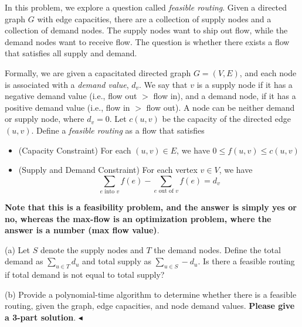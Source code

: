 \documentclass[11pt]{article}
\newenvironment{problem}[2][Problem]{\begin{trivlist}
    \item[\hskip \labelsep{\bfseries#1}\hskip\labelsep{\bfseries#2.}]\mbox{}\newline}{\hfill$\blacktriangleleft$\end{trivlist}}
\begin{document}
\begin{problem}{4. (Feasible Routing)}
    In this problem, we explore a question called \textit{feasible routing}. Given a directed graph $G$ with edge capacities, there are a collection of supply nodes and a collection of demand nodes. The supply nodes want to ship out flow, while the demand nodes want to receive flow. The question is whether there exists a flow that satisfies all supply and demand.

Formally, we are given a capacitated directed graph $G=(V,E)$, and each node is associated with a \textit{demand value}, $d_v$. We say that $v$ is a supply node if it has a negative demand value (i.e., flow out $>$ flow in), and a demand node, if it has a positive demand value (i.e., flow in $>$ flow out). A node can be neither demand or supply node, where $d_v = 0$. Let $c(u,v)$ be the capacity of the directed edge $(u,v)$. Define a \textit{feasible routing} as a flow that satisfies
\begin{itemize}
    \item (Capacity Constraint) For each $(u,v)\in E$, we have $0\leqslant f(u,v) \leqslant c(u,v)$
    \item (Supply and Demand Constraint) For each vertex $v\in V$, we have
    $$
    \sum_{e\text{ into }v} f(e) - \sum_{e\text{ out of }v} f(e) = d_v
    $$
\end{itemize}

\textbf{Note that this is a feasibility problem, and the answer is simply yes or no, whereas the max-flow is an optimization problem, where the answer is a number (max flow value)}.

(a) Let $S$ denote the supply nodes and $T$ the demand nodes. Define the total demand as $\sum_{u\in T}d_u$ and total supply as $\sum_{u\in S}-d_u$. Is there a feasible routing if total demand is not equal to total supply?

(b) Provide a polynomial-time algorithm to determine whether there is a feasible routing, given the graph, edge capacities, and node demand values. \textbf{Please give a 3-part solution}.
\end{problem}
\end{document}

